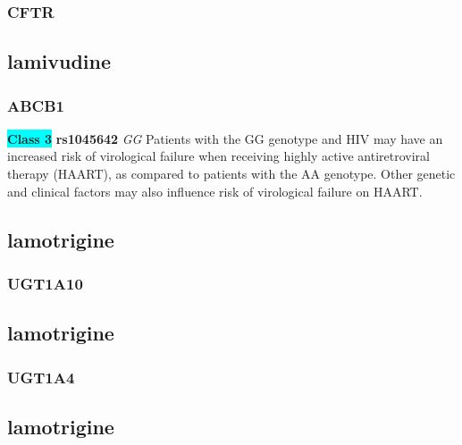 \documentclass{book}
\begin{document}
\subsubsection{ CFTR }

\begin{center}



\end{center}\subsection{ lamivudine }


\subsubsection{ ABCB1 }

\begin{center}
\textbf{\colorbox{cyan} {Class 3}} \textbf{ rs1045642 } \textit{ GG }
Patients with the GG genotype and HIV may have an increased risk of virological failure when receiving highly active antiretroviral therapy (HAART), as compared to patients with the AA genotype. Other genetic and clinical factors may also influence risk of virological failure on HAART.


\end{center}\subsection{ lamotrigine }


\subsubsection{ UGT1A10 }

\begin{center}



\end{center}\subsection{ lamotrigine }


\subsubsection{ UGT1A4 }

\begin{center}



\end{center}\subsection{ lamotrigine }
\end{document}
